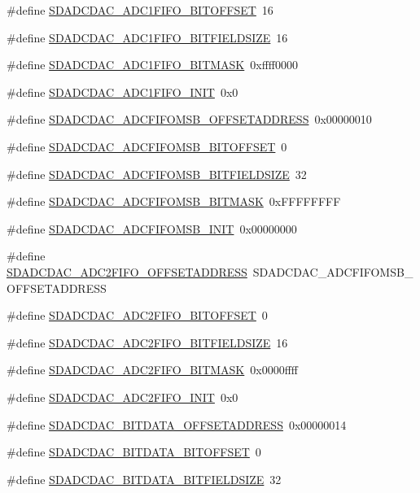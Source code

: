 \begin{DoxyCompactItemize}
\item 
\#define \hyperlink{a00569_a0097077e1b6a59bb14829330b2d8f23f}{SDADCDAC\_\-ADC1FIFO\_\-BITOFFSET}~16
\item 
\#define \hyperlink{a00569_a2392163b4e8e9bbb4765953b5b8712dc}{SDADCDAC\_\-ADC1FIFO\_\-BITFIELDSIZE}~16
\item 
\#define \hyperlink{a00569_ac4e60da0b13cd0e0df38e9bb0f55a1a3}{SDADCDAC\_\-ADC1FIFO\_\-BITMASK}~0xffff0000
\item 
\#define \hyperlink{a00569_af3135da493e7d3a9dde5eb24109bc421}{SDADCDAC\_\-ADC1FIFO\_\-INIT}~0x0
\item 
\#define \hyperlink{a00569_a447e731c507a195277d7ce30b6b7c047}{SDADCDAC\_\-ADCFIFOMSB\_\-OFFSETADDRESS}~0x00000010
\item 
\#define \hyperlink{a00569_a854fb12d62d41cb0a5dcbaa8b782e091}{SDADCDAC\_\-ADCFIFOMSB\_\-BITOFFSET}~0
\item 
\#define \hyperlink{a00569_a0acac5b6d974112fe5e09b11a5d9157e}{SDADCDAC\_\-ADCFIFOMSB\_\-BITFIELDSIZE}~32
\item 
\#define \hyperlink{a00569_a88dfde094a4ad2ed937fa2b504276077}{SDADCDAC\_\-ADCFIFOMSB\_\-BITMASK}~0xFFFFFFFF
\item 
\#define \hyperlink{a00569_a24cf3c0c18cf6b816fddb0b9a7042a92}{SDADCDAC\_\-ADCFIFOMSB\_\-INIT}~0x00000000
\item 
\#define \hyperlink{a00569_a9127db5db490d19067a7d8b57aa458ee}{SDADCDAC\_\-ADC2FIFO\_\-OFFSETADDRESS}~SDADCDAC\_\-ADCFIFOMSB\_\-OFFSETADDRESS
\item 
\#define \hyperlink{a00569_ab3718d77b95a909e23142c26a687a7d6}{SDADCDAC\_\-ADC2FIFO\_\-BITOFFSET}~0
\item 
\#define \hyperlink{a00569_a71483272ed23644880d47b280e4c368c}{SDADCDAC\_\-ADC2FIFO\_\-BITFIELDSIZE}~16
\item 
\#define \hyperlink{a00569_ab3bf65384a920e8d2210614a23036b45}{SDADCDAC\_\-ADC2FIFO\_\-BITMASK}~0x0000ffff
\item 
\#define \hyperlink{a00569_a5c3f723659effe2d66aa1b7a2cedb5a3}{SDADCDAC\_\-ADC2FIFO\_\-INIT}~0x0
\item 
\#define \hyperlink{a00569_a3855e946b43442a33e9bc2f65e2df4c9}{SDADCDAC\_\-BITDATA\_\-OFFSETADDRESS}~0x00000014
\item 
\#define \hyperlink{a00569_ad45d7682280c4420c8d40a08f2163dec}{SDADCDAC\_\-BITDATA\_\-BITOFFSET}~0
\item 
\#define \hyperlink{a00569_a472447286425d9fe9e6ca118fddb13ec}{SDADCDAC\_\-BITDATA\_\-BITFIELDSIZE}~32
\item 

\end{DoxyCompactItemize}
